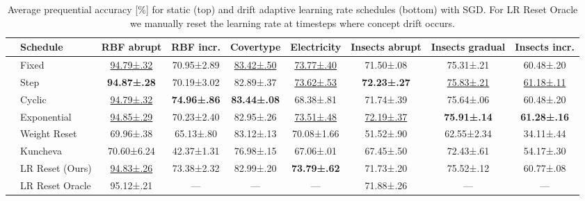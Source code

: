 \documentclass[letterpaper]{article} %
\begin{document}
\begin{table}[h]
	\centering
	\small
	\begin{tabular}{llccccccc}
		\toprule
		                                                    & Schedule        & RBF abrupt            & RBF incr.           & Covertype             & Electricity           & Insects abrupt        & Insects gradual       & Insects incr.         \\
		\midrule
		\multirow{4}{*}{\rotatebox[origin=c]{90}{Static}}   & Fixed           & \underline{94.79±.32} & 70.95±2.89          & \underline{83.42±.50} & \underline{73.77±.40} & 71.50±.08             & 75.31±.21             & 60.48±.20             \\
		                                                    & Step            & \bfseries 94.87±.28   & 70.19±3.02          & 82.89±.37             & \underline{73.62±.53} & \bfseries 72.23±.27   & \underline{75.83±.21} & \underline{61.18±.11} \\
		                                                    & Cyclic          & \underline{94.79±.32} & \bfseries 74.96±.86 & \bfseries 83.44±.08   & 68.38±.81             & 71.74±.39             & 75.64±.06             & 60.48±.20             \\
		                                                    & Exponential     & \underline{94.85±.29} & 70.23±2.40          & 82.95±.26             & \underline{73.51±.48} & \underline{72.19±.37} & \bfseries 75.91±.14   & \bfseries 61.28±.16   \\ \midrule
		\multirow{4}{*}{\rotatebox[origin=c]{90}{Adaptive}} & Weight Reset    & 69.96±.38             & 65.13±.80           & 83.12±.13             & 70.08±1.66            & 51.52±.90             & 62.55±2.34            & 34.11±.44             \\
		                                                    & Kuncheva        & 70.60±6.24            & 42.37±1.31          & 76.98±.15             & 67.06±.01             & 67.45±.50             & 72.43±.61             & 54.17±.30             \\
		                                                    & LR Reset (Ours) & \underline{94.83±.26} & 73.38±2.32          & 82.99±.20             & \bfseries 73.79±.62   & 71.73±.20             & 75.52±.12             & 60.77±.08             \\
		                                                    & LR Reset Oracle & 95.12±.21             & ---                 & ---                   & ---                   & 71.88±.26             & ---                   & ---                   \\
		\bottomrule
	\end{tabular}
	\caption{Average prequential accuracy [\%] for static (top) and drift adaptive learning rate schedules (bottom) with SGD. For LR Reset Oracle we manually reset the learning rate at timesteps where concept drift occurs.}
	\label{tab:lr_resetting}
\end{table}
\end{document}
